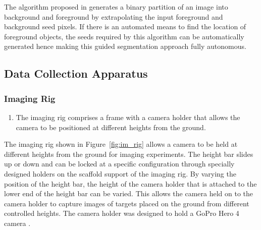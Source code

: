 \documentclass {udthesis}
\begin{document}
The algorithm proposed in \cite{onecut} generates a binary partition of an image into background and foreground by extrapolating the input foreground and background seed pixels. If there is an automated means to find the location of foreground objects, the seeds required by this algorithm can be automatically generated hence making this guided segmentation approach fully autonomous.

\subsection{Data Collection Apparatus}

\subsubsection{Imaging Rig}
\label{sec:imaging_rig}

\begin{enumerate}
	\item The imaging rig comprises a frame with a camera holder that allows the camera to be positioned at different heights from the ground.
\end{enumerate}


The imaging rig shown in Figure~\ref{fig:im_rig} allows a camera to be held at different heights from the ground for imaging experiments. The height bar slides up or down and can be locked at a specific configuration through specially designed holders on the scaffold support of the imaging rig. By varying the position of the height bar, the height of the camera holder that is attached to the lower end of the height bar can be varied. This allows the camera held on to the camera holder to capture images of targets placed on the ground from different controlled heights. The camera holder was designed to hold a GoPro Hero 4 camera \cite{gopro}.
	
\end{document}

